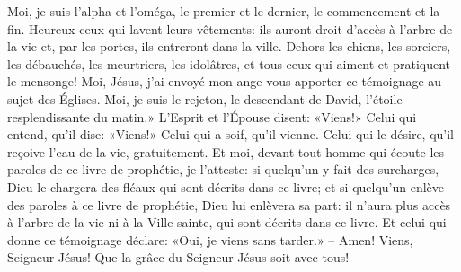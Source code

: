 Moi, je suis l’alpha et l’oméga,
	le premier et le dernier, le commencement et la fin.
Heureux ceux qui lavent leurs vêtements:
	ils auront droit d’accès à l’arbre de la vie
	et, par les portes, ils entreront dans la ville.
Dehors les chiens, les sorciers, les débauchés, les meurtriers,
	les idolâtres, et tous ceux qui aiment et pratiquent le mensonge!
Moi, Jésus,
	j’ai envoyé mon ange vous apporter ce témoignage au sujet des Églises.
Moi, je suis le rejeton, le descendant de David,
	l’étoile resplendissante du matin.»
L’Esprit et l’Épouse disent: «Viens!»
	Celui qui entend, qu’il dise: «Viens!»
	Celui qui a soif, qu’il vienne.
	Celui qui le désire, qu’il reçoive l’eau de la vie, gratuitement.
Et moi, devant tout homme qui écoute les paroles de ce livre de prophétie,
	je l’atteste: si quelqu’un y fait des surcharges,
	Dieu le chargera des fléaux qui sont décrits dans ce livre;
	et si quelqu’un enlève des paroles à ce livre de prophétie,
	Dieu lui enlèvera sa part:
	il n’aura plus accès à l’arbre de la vie ni à la Ville sainte,
		qui sont décrits dans ce livre.
Et celui qui donne ce témoignage déclare:
	«Oui, je viens sans tarder.»
	– Amen! Viens, Seigneur Jésus!
Que la grâce du Seigneur Jésus soit avec tous!

